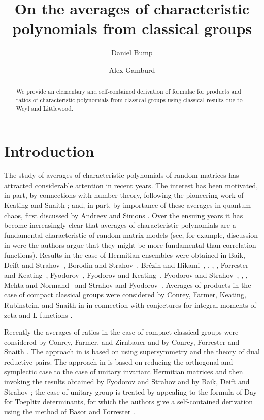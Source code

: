 \documentclass[11pt]{amsart}
\title [Averages of characteristic polynomials] {On the averages of
characteristic polynomials from classical groups }
\author{Daniel Bump}
\author{Alex Gamburd}
\begin{document}
\begin{abstract}
We provide an elementary and self-contained derivation of formulae
for products and ratios of characteristic polynomials from
classical groups using classical results due to Weyl and
Littlewood.
\end{abstract}

\maketitle

\section{Introduction}

The study of averages of characteristic polynomials of random
matrices has attracted considerable attention in recent years. The
interest has been  motivated, in part,  by connections with number
theory, following the pioneering work of Keating and Snaith
{\cite{KS00}}; and, in part, by importance of these averages in
quantum chaos, first discussed by Andreev and Simons
{\cite{as95}}.  Over the ensuing years it has become increasingly
clear that averages of characteristic polynomials are a
fundamental characteristic of random matrix models (see, for
example, discussion in \cite[1.6]{bs04} were the authors argue
that they might be more fundamental than correlation functions).
Results in the case of Hermitian ensembles were obtained in Baik,
Deift and Strahov~{\cite{bds}}, Borodin and Strahov~{\cite{bs04}},
Br\'ezin and Hikami~{\cite{bh1}}, {\cite{bh2}}, {\cite{bh3}},
{\cite{bh4}}, Forrester and Keating~{\cite{fh04a}},
Fyodorov~{\cite{f1}}, Fyodorov and Keating~{\cite{f2}}, Fyodorov
and Strahov~{\cite{f4}}, {\cite{f3}}, {\cite{f5}}, Mehta and
Normand~{\cite{MN}} and Strahov and Fyodorov~{\cite{sf}}. Averages
of products in the case of compact classical groups were
considered by Conrey, Farmer, Keating, Rubinstein, and Snaith in
{\cite{CFKRS2}} in connection with conjectures for integral
moments of zeta and L-functions {\cite{CFKRS1}}.

Recently the averages of ratios in the case of compact classical
groups were considered by Conrey, Farmer, and Zirnbauer
{\cite{cfz}} and by Conrey, Forrester and Snaith {\cite{cfs}}. The
approach in {\cite{cfz}} is based on using supersymmetry and the
theory of dual reductive pairs. The approach in {\cite{cfs}} is
based on reducing the orthogonal and symplectic case to the case
of unitary invariant Hermitian matrices  and then invoking the
results obtained by Fyodorov and Strahov {\cite{f3}} and by Baik,
Deift and Strahov {\cite{bds}}; the case of unitary group is
treated by appealing to the formula of Day {\cite{day}} for
Toeplitz determinants, for which the authors give a self-contained
derivation using the method of Basor and Forrester {\cite{bf94}}.
\end{document}
